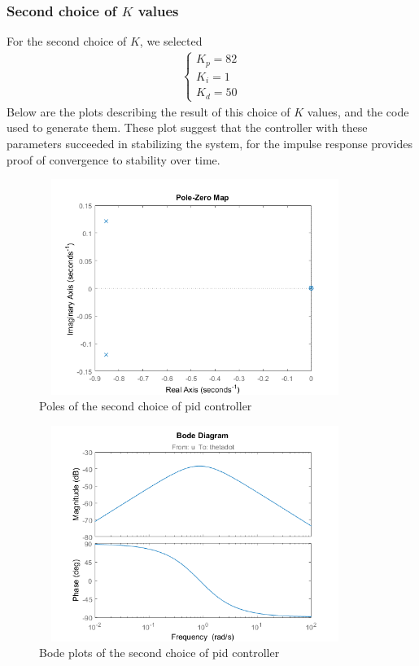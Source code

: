 \documentclass [12pt,letterpaper]{exam}
\begin{document}


\subsubsection{Second choice of $K$ values}
For the second choice of $K$, we selected
\begin{align}
\begin{cases}
K_p = 82 \\
K_i = 1 \\
K_d = 50
\end{cases}
\end{align}
Below are the plots describing the result of this choice of $K$ values, and the code used to generate them. These plot suggest that the controller with these parameters succeeded in stabilizing the system, for the impulse response provides proof of convergence to stability over time.

\begin{figure}[H]
  \centering
    \includegraphics[width=10.15cm, height=7cm]{pid2_poles} 
  \caption{Poles of the second choice of pid controller}
  \label{fig:pid2_poles}
\end{figure}

\begin{figure}[H]
  \centering
    \includegraphics[width=10.15cm, height=7cm]{pid2_bode} 
  \caption{Bode plots of the second choice of pid controller}
  \label{fig:pid2_bode}
\end{figure}
\end{document}
